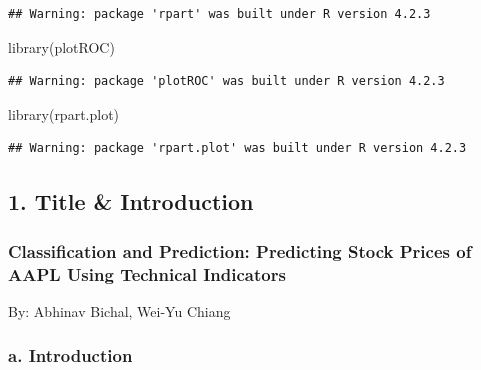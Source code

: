 \documentclass[
]{article}
\newenvironment{Shaded}{\begin{snugshade}}{\end{snugshade}}
\newcommand{\FunctionTok}[1]{\textcolor[rgb]{0.00,0.00,0.00}{#1}}
\newcommand{\NormalTok}[1]{#1}
\begin{document}
\begin{verbatim}
## Warning: package 'rpart' was built under R version 4.2.3
\end{verbatim}

\begin{Shaded}
\begin{Highlighting}[]
\FunctionTok{library}\NormalTok{(plotROC)}
\end{Highlighting}
\end{Shaded}

\begin{verbatim}
## Warning: package 'plotROC' was built under R version 4.2.3
\end{verbatim}

\begin{Shaded}
\begin{Highlighting}[]
\FunctionTok{library}\NormalTok{(rpart.plot)}
\end{Highlighting}
\end{Shaded}

\begin{verbatim}
## Warning: package 'rpart.plot' was built under R version 4.2.3
\end{verbatim}

\hypertarget{title-introduction}{%
\subsection{1. Title \& Introduction}\label{title-introduction}}

\hypertarget{classification-and-prediction-predicting-stock-prices-of-aapl-using-technical-indicators}{%
\subsubsection{\texorpdfstring{\textbf{Classification and Prediction:}
Predicting Stock Prices of AAPL Using Technical
Indicators}{Classification and Prediction: Predicting Stock Prices of AAPL Using Technical Indicators}}\label{classification-and-prediction-predicting-stock-prices-of-aapl-using-technical-indicators}}

By: Abhinav Bichal, Wei-Yu Chiang

\hypertarget{a.-introduction}{%
\subsubsection{\texorpdfstring{\textbf{a.
Introduction}}{a. Introduction}}\label{a.-introduction}}
\end{document}
